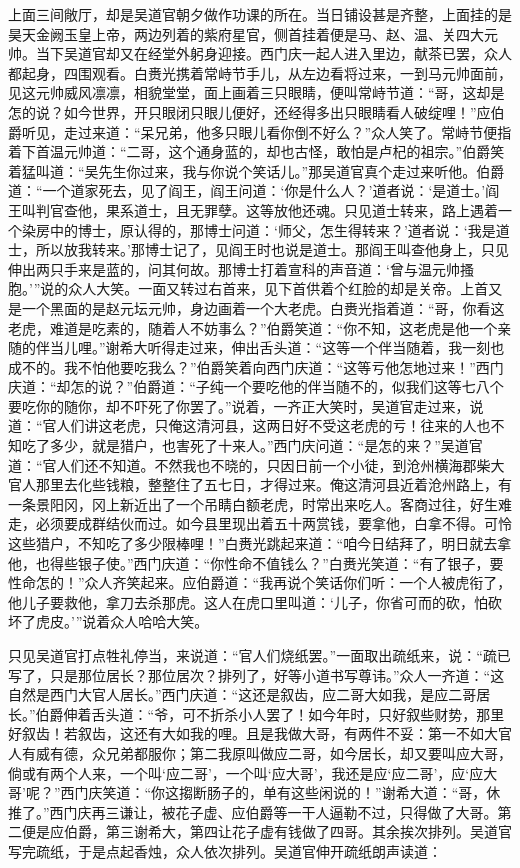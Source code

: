 上面三间敞厅，却是吴道官朝夕做作功课的所在。当日铺设甚是齐整，上面挂的是昊天金阙玉皇上帝，两边列着的紫府星官，侧首挂着便是马、赵、温、关四大元帅。当下吴道官却又在经堂外躬身迎接。西门庆一起人进入里边，献茶已罢，众人都起身，四围观看。白赉光携着常峙节手儿，从左边看将过来，一到马元帅面前，见这元帅威风凛凛，相貌堂堂，面上画着三只眼睛，便叫常峙节道：“哥，这却是怎的说？如今世界，开只眼闭只眼儿便好，还经得多出只眼睛看人破绽哩！”应伯爵听见，走过来道：“呆兄弟，他多只眼儿看你倒不好么？”众人笑了。常峙节便指着下首温元帅道：“二哥，这个通身蓝的，却也古怪，敢怕是卢杞的祖宗。”伯爵笑着猛叫道：“吴先生你过来，我与你说个笑话儿。”那吴道官真个走过来听他。伯爵道：“一个道家死去，见了阎王，阎王问道：‘你是什么人？’道者说：‘是道士。’阎王叫判官查他，果系道士，且无罪孽。这等放他还魂。只见道士转来，路上遇着一个染房中的博士，原认得的，那博士问道：‘师父，怎生得转来？’道者说：‘我是道士，所以放我转来。’那博士记了，见阎王时也说是道士。那阎王叫查他身上，只见伸出两只手来是蓝的，问其何故。那博士打着宣科的声音道：‘曾与温元帅搔胞。’”说的众人大笑。一面又转过右首来，见下首供着个红脸的却是关帝。上首又是一个黑面的是赵元坛元帅，身边画着一个大老虎。白赉光指着道：“哥，你看这老虎，难道是吃素的，随着人不妨事么？”伯爵笑道：“你不知，这老虎是他一个亲随的伴当儿哩。”谢希大听得走过来，伸出舌头道：“这等一个伴当随着，我一刻也成不的。我不怕他要吃我么？”伯爵笑着向西门庆道：“这等亏他怎地过来！”西门庆道：“却怎的说？”伯爵道：“子纯一个要吃他的伴当随不的，似我们这等七八个要吃你的随你，却不吓死了你罢了。”说着，一齐正大笑时，吴道官走过来，说道：“官人们讲这老虎，只俺这清河县，这两日好不受这老虎的亏！往来的人也不知吃了多少，就是猎户，也害死了十来人。”西门庆问道：“是怎的来？”吴道官道：“官人们还不知道。不然我也不晓的，只因日前一个小徒，到沧州横海郡柴大官人那里去化些钱粮，整整住了五七日，才得过来。俺这清河县近着沧州路上，有一条景阳冈，冈上新近出了一个吊睛白额老虎，时常出来吃人。客商过往，好生难走，必须要成群结伙而过。如今县里现出着五十两赏钱，要拿他，白拿不得。可怜这些猎户，不知吃了多少限棒哩！”白赉光跳起来道：“咱今日结拜了，明日就去拿他，也得些银子使。”西门庆道：“你性命不值钱么？”白赉光笑道：“有了银子，要性命怎的！”众人齐笑起来。应伯爵道：“我再说个笑话你们听：一个人被虎衔了，他儿子要救他，拿刀去杀那虎。这人在虎口里叫道：‘儿子，你省可而的砍，怕砍坏了虎皮。’”说着众人哈哈大笑。

只见吴道官打点牲礼停当，来说道：“官人们烧纸罢。”一面取出疏纸来，说：“疏已写了，只是那位居长？那位居次？排列了，好等小道书写尊讳。”众人一齐道：“这自然是西门大官人居长。”西门庆道：“这还是叙齿，应二哥大如我，是应二哥居长。”伯爵伸着舌头道：“爷，可不折杀小人罢了！如今年时，只好叙些财势，那里好叙齿！若叙齿，这还有大如我的哩。且是我做大哥，有两件不妥：第一不如大官人有威有德，众兄弟都服你；第二我原叫做应二哥，如今居长，却又要叫应大哥，倘或有两个人来，一个叫‘应二哥’，一个叫‘应大哥’，我还是应‘应二哥’，应‘应大哥’呢？”西门庆笑道：“你这搊断肠子的，单有这些闲说的！”谢希大道：“哥，休推了。”西门庆再三谦让，被花子虚、应伯爵等一干人逼勒不过，只得做了大哥。第二便是应伯爵，第三谢希大，第四让花子虚有钱做了四哥。其余挨次排列。吴道官写完疏纸，于是点起香烛，众人依次排列。吴道官伸开疏纸朗声读道：

